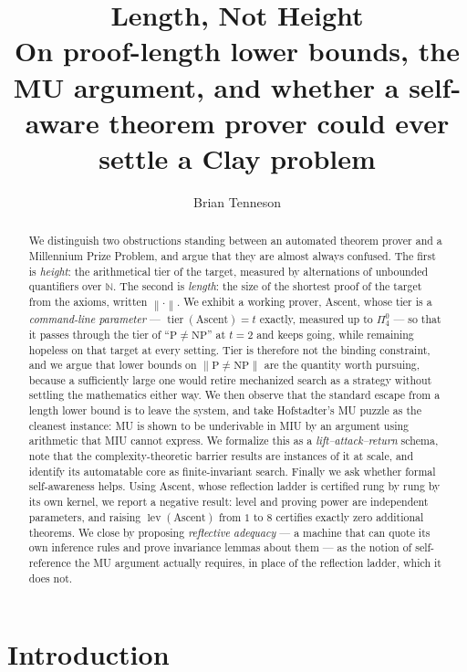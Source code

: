 \documentclass[11pt,a4paper]{article}
\title{\bfseries Length, Not Height\\[0.4em]
\large On proof-length lower bounds, the MU argument, and whether a
self-aware theorem prover could ever settle a Clay problem}
\author{Brian Tenneson}
\date{}
\newcommand{\Pai}[2]{\Pi^{#1}_{#2}}
\newcommand{\shortest}[1]{\left\lVert #1 \right\rVert}
\newcommand{\lev}{\operatorname{lev}}
\newcommand{\tier}{\operatorname{tier}}
\begin{document}
\maketitle

\begin{abstract}
\noindent
We distinguish two obstructions standing between an automated theorem prover
and a Millennium Prize Problem, and argue that they are almost always
confused. The first is \emph{height}: the arithmetical tier of the target,
measured by alternations of unbounded quantifiers over $\mathbb{N}$. The
second is \emph{length}: the size of the shortest proof of the target from
the axioms, written $\shortest{\cdot}$. We exhibit a working prover, Ascent,
whose tier is a \emph{command-line parameter} --- $\tier(\text{Ascent}) = t$
exactly, measured up to $\Pai{0}{4}$ --- so that it passes through the tier of
``$\mathrm{P} \neq \mathrm{NP}$'' at $t = 2$ and keeps going, while remaining
hopeless on that target at every setting. Tier is therefore not the binding
constraint, and we
argue that lower bounds on $\shortest{\mathrm{P} \neq \mathrm{NP}}$ are the
quantity worth pursuing, because a sufficiently large one would retire
mechanized search as a strategy without settling the mathematics either way.
We then observe that the standard escape from a length lower bound is to
leave the system, and take Hofstadter's MU puzzle as the cleanest instance:
MU is shown to be underivable in MIU by an argument using arithmetic that MIU
cannot express. We formalize this as a \emph{lift--attack--return} schema,
note that the complexity-theoretic barrier results are instances of it at
scale, and identify its automatable core as finite-invariant search. Finally
we ask whether formal self-awareness helps. Using Ascent, whose reflection
ladder is certified rung by rung by its own kernel, we report a negative
result: level and proving power are independent parameters, and raising
$\lev(\text{Ascent})$ from $1$ to $8$ certifies exactly zero additional
theorems. We close by proposing \emph{reflective adequacy} --- a machine that
can quote its own inference rules and prove invariance lemmas about them ---
as the notion of self-reference the MU argument actually requires, in place
of the reflection ladder, which it does not.
\end{abstract}

\section{Introduction}
\end{document}
